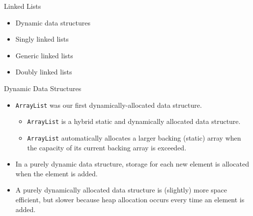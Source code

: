 \documentclass{beamer}
\author[Chris Simpkins]
{Christopher Simpkins \\\texttt{chris.simpkins@gatech.edu}}
\institute[Georgia Tech] %
\date[CS 1331]{}
\begin{document}
\begin{frame}
  \titlepage
\end{frame}

\begin{frame}[fragile]{Linked Lists}

\begin{itemize}
\item Dynamic data structures
\item Singly linked lists
\item Generic linked lists
\item Doubly linked lists
\end{itemize}

\end{frame}

\begin{frame}[fragile]{Dynamic Data Structures}


\begin{itemize}
\item {\tt ArrayList} was our first dynamically-allocated data structure.
\begin{itemize}
\item {\tt ArrayList} is a hybrid static and dynamically allocated data structure.
\item {\tt ArrayList} automatically allocates a larger backing (static) array when the capacity of its current backing array is exceeded.
\end{itemize}
\item In a purely dynamic data structure, storage for each new element is allocated when the element is added.
\item A purely dynamically allocated data structure is (slightly) more space efficient, but slower because heap allocation occurs every time an element is added.
\end{itemize}


\end{frame}
\end{document}

